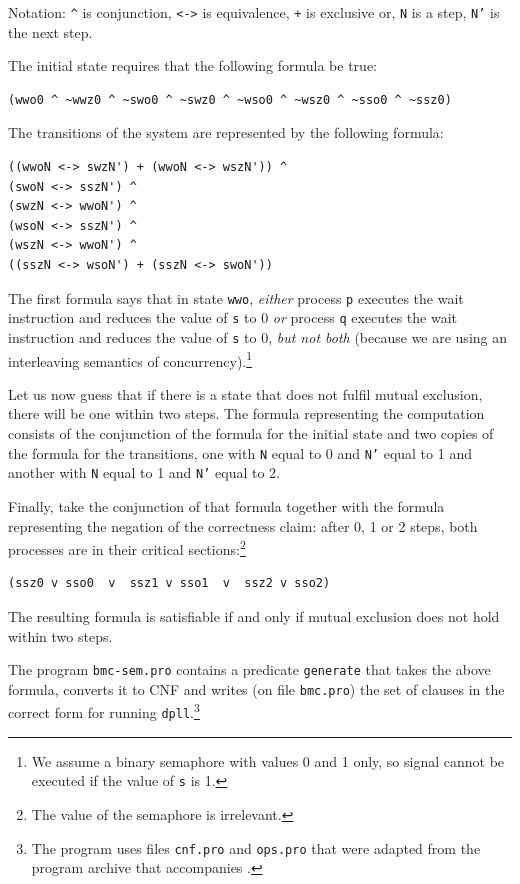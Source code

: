 \documentclass[11pt]{report}
\newcommand*{\p}[1]{\textup{\texttt{#1}}}
\begin{document}
Notation: \verb=^= is conjunction, \verb=<->= is equivalence, \verb=+= is
exclusive or, \p{N} is a step, \p{N'} is the next step.

The initial state requires that the following formula be true:
\begin{verbatim}
(wwo0 ^ ~wwz0 ^ ~swo0 ^ ~swz0 ^ ~wso0 ^ ~wsz0 ^ ~sso0 ^ ~ssz0)
\end{verbatim}

The transitions of the system are represented by the following formula:
\begin{verbatim}
((wwoN <-> swzN') + (wwoN <-> wszN')) ^
(swoN <-> sszN') ^
(swzN <-> wwoN') ^
(wsoN <-> sszN') ^
(wszN <-> wwoN') ^
((sszN <-> wsoN') + (sszN <-> swoN'))
\end{verbatim}

The first formula says that in state \p{wwo}, \emph{either} process
\p{p} executes the wait instruction and reduces the value of \p{s} to 0
\emph{or} process \p{q} executes the wait instruction and reduces the
value of \p{s} to 0, \emph{but not both} (because we are using an
interleaving semantics of concurrency).\footnote{We assume a binary
semaphore with values 0 and 1 only, so signal cannot be executed if
the value of \p{s} is 1.}

Let us now guess that if there is a state that does not fulfil mutual
exclusion, there will be one within two steps. The formula representing
the computation consists of the conjunction of the formula for the
initial state and two copies of the formula for the transitions, one
with \p{N} equal to 0 and \p{N'} equal to 1 and another with \p{N} equal
to 1 and \p{N'} equal to 2.

Finally, take the conjunction of that formula together with the formula
representing the negation of the correctness claim: after 0, 1 or 2
steps, both processes are in their critical sections:\footnote{The value
of the semaphore is irrelevant.}

\begin{verbatim}
(ssz0 v sso0  v  ssz1 v sso1  v  ssz2 v sso2)
\end{verbatim}

The resulting formula is satisfiable if and only if mutual exclusion
does not hold within two steps.

The program \p{bmc-sem.pro} contains a predicate \p{generate} that takes
the above formula, converts it to CNF and writes (on file \p{bmc.pro})
the set of clauses in the correct form for running
\p{dpll}.\footnote{The program uses files \p{cnf.pro} and \p{ops.pro}
that were adapted from the program archive that accompanies
\cite{mlcs}.}
\end{document}
